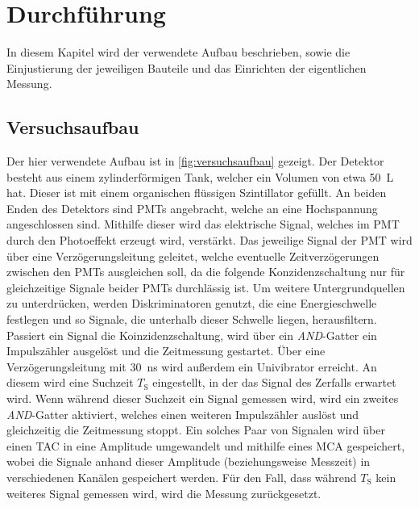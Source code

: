 \section{Durchführung}
\label{sec:durchfuehrung}

In diesem Kapitel wird der verwendete Aufbau beschrieben,
sowie die Einjustierung der jeweiligen Bauteile und das Einrichten der eigentlichen Messung.


\subsection{Versuchsaufbau}

Der hier verwendete Aufbau ist in \autoref{fig:versuchsaufbau} gezeigt.
Der Detektor besteht aus einem zylinderförmigen Tank,
welcher ein Volumen von etwa \SI{50}{\liter} hat.
Dieser ist mit einem organischen flüssigen Szintillator \cite{kolanoskiwermes} gefüllt.
An beiden Enden des Detektors sind \acp{PMT} \cite{wrleo} angebracht,
welche an eine Hochspannung angeschlossen sind.
Mithilfe dieser wird das elektrische Signal,
welches im \ac{PMT} durch den Photoeffekt erzeugt wird,
verstärkt.
Das jeweilige Signal der \ac{PMT} wird über eine Verzögerungsleitung geleitet,
welche eventuelle Zeitverzögerungen zwischen den \acp{PMT} ausgleichen soll,
da die folgende Konzidenzschaltung nur für gleichzeitige Signale beider \acp{PMT} durchlässig ist.
Um weitere Untergrundquellen zu unterdrücken,
werden Diskriminatoren genutzt,
die eine Energieschwelle festlegen und so Signale,
die unterhalb dieser Schwelle liegen,
herausfiltern.
Passiert ein Signal die Koinzidenzschaltung,
wird über ein \textit{AND}-Gatter ein Impulszähler ausgelöst und die Zeitmessung gestartet.
Über eine Verzögerungsleitung mit \SI{30}{\nano\second} wird außerdem ein Univibrator erreicht.
An diesem wird eine Suchzeit $T_\text{S}$ eingestellt,
in der das Signal des Zerfalls erwartet wird.
Wenn während dieser Suchzeit ein Signal gemessen wird,
wird ein zweites \textit{AND}-Gatter aktiviert,
welches einen weiteren Impulszähler auslöst und gleichzeitig die Zeitmessung stoppt.
Ein solches Paar von Signalen wird über einen \ac{TAC} \cite{wrleo} in eine Amplitude umgewandelt und mithilfe eines \ac{MCA} \cite{wrleo} gespeichert, %
wobei die Signale anhand dieser Amplitude (beziehungsweise Messzeit)
in verschiedenen Kanälen gespeichert werden.
Für den Fall,
dass während $T_\text{S}$ kein weiteres Signal gemessen wird,
wird die Messung zurückgesetzt.

